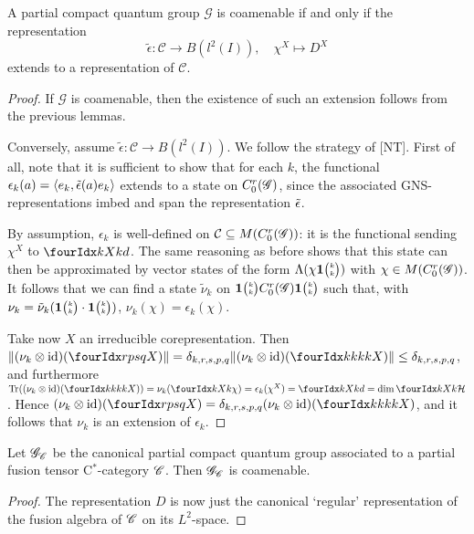 
\begin{Theorem} A partial compact quantum group $\mathscr{G}$ is coamenable if and only if the representation \[\tilde{\epsilon}: \mathscr{C} \rightarrow B(l^2(I)), \quad \chi^X \mapsto D^X\] extends to a representation of $\mathcal{C}$.
\end{Theorem}

\begin{proof} If $\mathscr{G}$ is coamenable, then the existence of such an extension follows from the previous lemmas. 

Conversely, assume $\tilde{\epsilon}:\mathcal{C}\rightarrow B(l^2(I))$. We follow the strategy of [NT]. First of all, note that it is sufficient to show that for each $k$, the functional $\epsilon_k(a) = \langle e_k,\operatorname{\tilde{\epsilon}}(a)e_k\rangle$ extends to a state on $C^{r}_{0}(\mathscr{G})$, since the associated GNS-representations imbed and span the representation $\operatorname{\tilde{\epsilon}}$. 

By assumption, $\epsilon_k$ is well-defined on $\mathcal{C}\subseteq M(C^{r}_{0}(\mathscr{G}))$: it is the functional sending $\chi^X$ to $\Gr{d}{}{X}{k}{k}$. The same reasoning as before shows that this state can then be approximated by vector states of the form $\Lambda(\chi \mathbf{1}{\tiny {\begin{pmatrix} k\\k\end{pmatrix}}})$ with $\chi\in M(C^{r}_{0}(\mathscr{G}))$. It follows that we can find a state $\tilde{\nu}_k$ on $\mathbf{1}{\tiny {\begin{pmatrix} k\\k\end{pmatrix}}}C^{r}_{0}(\mathscr{G})\mathbf{1}{\tiny {\begin{pmatrix} k\\k\end{pmatrix}}}$ such that, with $\nu_k = \tilde{\nu}_k(\mathbf{1}{\tiny {\begin{pmatrix} k\\k\end{pmatrix}}}\cdot \mathbf{1}{\tiny {\begin{pmatrix} k\\k\end{pmatrix}}})$, $\nu_k(\chi) = \epsilon_k(\chi)$. 

Take now $X$ an irreducible corepresentation. Then $\|(\nu_k\otimes \id)(\Gr{X}{r}{s}{p}{q})\| = \delta_{k,r,s,p,q} \|(\nu_k\otimes \id)(\Gr{X}{k}{k}{k}{k})\| \leq \delta_{k,r,s,p,q}$, and furthermore $\Tr( (\nu_k\otimes \id)(\Gr{X}{k}{k}{k}{k})) = \nu_k(\Gr{\chi}{}{X}{k}{k}) = \epsilon_k(\chi^X) = \Gr{d}{}{X}{k}{k} = \dim \Gr{\Hsp}{}{X}{k}{k}$. Hence $ (\nu_k\otimes \id)(\Gr{X}{r}{s}{p}{q}) = \delta_{k,r,s,p,q} (\nu_k\otimes \id)(\Gr{X}{k}{k}{k}{k})$, and it follows that $\nu_k$ is an extension of $\epsilon_k$. 
\end{proof}  
 
 \begin{Cor} Let $\mathscr{G}_{\mathscr{C}}$ be the canonical partial compact quantum group associated to a partial fusion tensor C$^*$-category $\mathscr{C}$. Then $\mathscr{G}_{\mathscr{C}}$ is coamenable.  
 \end{Cor}
 \begin{proof} The representation $D$ is now just the canonical `regular' representation of the fusion algebra of $\mathscr{C}$ on its $L^2$-space. 
 \end{proof}
 

